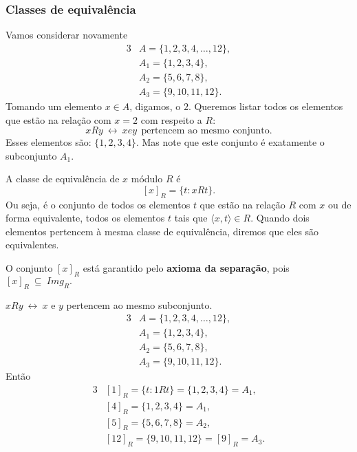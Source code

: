       \subsubsection{Classes de equivalência}\label{subsubsec: CEQ}
         Vamos considerar novamente
         \begin{alignat*}{3}
            &A = \{1,2,3,4, \dots , 12\},\\
            &A_{1} = \{1,2,3,4\},\\
            &A_{2} = \{5,6,7,8\},\\
            &A_{3} = \{9,10,11,12\}.
         \end{alignat*}
         Tomando um elemento $x \in A$, digamos, o $2$. Queremos listar todos os elementos que estão na relação com $x = 2$ com respeito a $R$:
         $$xRy\ \leftrightarrow\ x e y\ \ \textrm{pertencem\ ao\ mesmo\ conjunto.}$$
         Esses elementos são: $\{1,2,3,4\}.$ Mas note que este conjunto é exatamente o subconjunto $A_{1}$.
         \begin{definition}
            A classe de equivalência de $x$ módulo $R$ é
            $$[x]_{R} = \{t: xRt\}.$$
            Ou seja, é o conjunto de todos os elementos $t$ que estão na relação $R$ com $x$ ou de forma equivalente, todos os elementos $t$ tais que $\langle x, t \rangle \in R.$ Quando dois elementos pertencem à mesma classe de equivalência, diremos que eles são equivalentes.
         \end{definition}
         O conjunto $[x]_{R}$ está garantido pelo \textbf{axioma da separação}, pois $[x]_{R}\ \subseteq\ \mathit{Img}_{R}.$
         \begin{exmp}
            $xRy\ \leftrightarrow\ x$ e $y$ pertencem ao mesmo subconjunto.
            \begin{alignat*}{3}
               &A = \{1,2,3,4, \dots , 12\},\\
               &A_{1} = \{1,2,3,4\},\\
               &A_{2} = \{5,6,7,8\},\\
               &A_{3} = \{9,10,11,12\}.
            \end{alignat*}
            Então
            \begin{alignat*}{3}
               &[1]_{R} = \{t: 1Rt\} = \{1,2,3,4\} = A_{1},\\
               &[4]_{R} = \{1,2,3,4\} = A_{1},\\
               &[5]_{R} = \{5,6,7,8\} = A_{2},\\
               &[12]_{R} = \{9,10,11,12\} = [9]_{R} = A_{3}.
            \end{alignat*}
         \end{exmp}
